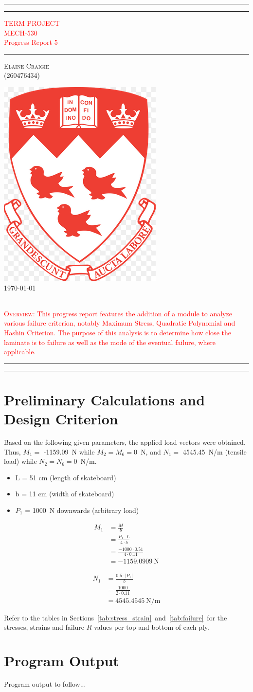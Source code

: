 \documentclass{SelimArticle}
\newcommand*{\plogo}{\fbox{$\mathcal{PL}$}} %
\newcommand*{\titleAT}{\begingroup %
\newlength{\drop} %
\drop=0.1\textheight %

\rule{\textwidth}{1pt}\par %
\vspace{2pt}\vspace{-\baselineskip} %
\rule{\textwidth}{0.4pt}\par %

\vspace{\drop} %
\centering %
\textcolor{Red}{ %
{\Huge TERM PROJECT}\\[0.5\baselineskip] %
{\Large MECH-530}\\[0.75\baselineskip] %
{\Huge Progress Report 5}} %

\vspace{0.25\drop} %
\rule{0.3\textwidth}{0.4pt}\par %
\vspace{\drop} %

{\Large \textsc{Elaine Craigie} \\ \vspace{0.5cm} (260476434)}\par %

\vfill %
\includegraphics[scale = 0.45]{pic_mcgill}
\vspace{2.0cm}
{\Large \\ \today}\par %
\vspace{1.0cm}
{\raggedleft{}
\textcolor{Red}{
{\large \\ \textsc{Overview:} This progress report features the addition of a module to analyze various failure criterion, notably Maximum Stress, Quadratic Polynomial and Hashin Criterion. The purpose of this analysis is to determine how close the laminate is to failure as well as the mode of the eventual failure, where applicable.}}}
\centering
\rule{\textwidth}{0.4pt}\par %
\vspace{2pt}\vspace{-\baselineskip} %
\rule{\textwidth}{1pt}\par %

\endgroup}
\begin{document}
\pagestyle{empty} %

\titleAT %

\printnomenclature[0.5in]
\newpage
{}
\setcounter{page}{1}
\section{Preliminary Calculations and Design Criterion}
Based on the following given parameters, the applied load vectors were obtained. Thus, $M_{1} =$ -1159.09~N while $M_{2} = M_{6} = 0$~N, and $N_{1} =$ 4545.45~N/m (tensile load) while $N_{2} = N_{6} = 0$~N/m.

\begin{itemize}
\item L = 51 cm (length of skateboard)
\item b = 11 cm (width of skateboard)
\item $P_{1}$ = 1000~N downwards (arbitrary load) 
\end{itemize}
 
\begin{align*}
M_{1} &= \frac{M}{b} \\
&= \frac{P_{1} \cdot L}{4 \cdot b} \\
&= \frac{-1000 \cdot 0.51}{4 \cdot 0.11} \\
&= -1159.0909~\text{N}
\end{align*}

\begin{align*} 
N_{1} &= \frac{0.5 \cdot |P_{1}|}{b} \\
&= \frac{1000}{2 \cdot 0.11} \\
&= 4545.4545~\text{N/m}
\end{align*}

Refer to the tables in Sections~\ref{tab:stress_strain}~and~\ref{tab:failure}~for the stresses, strains and failure $R$ values per top and bottom of each ply.

\section{Program Output}
\label{sec:programout}
Program output to follow...


\appendix

\end{document}
